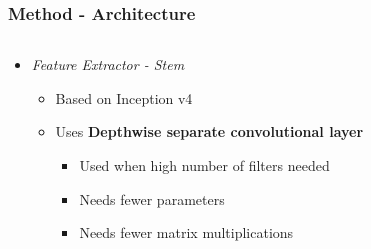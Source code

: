 \documentclass[9pt]{beamer}
\newenvironment{myframe}[1][]{%
\begin{frame}%
\frametitle{#1}
\setcounter{footnote}{0}


}{%
\end{frame}%
}
\begin{document}
\begin{myframe}[Method - Architecture]
    \begin{columns}[T]
        \begin{column}{.45\textwidth}
            \begin{itemize}
                \item \textit{Feature Extractor - Stem}
                \begin{itemize}
                    \item Based on Inception v4 \footnotemark
                    \item Uses \textbf{Depthwise separate convolutional layer}\footnotemark\footnotemark
                    \begin{itemize}
                        \item Used when high number of filters needed
                        \item Needs fewer parameters
                        \item Needs fewer matrix multiplications
                    \end{itemize}
                \end{itemize}
            \end{itemize}
        \end{column}
        \begin{column}{.45\textwidth}
            \begin{figure}

\end{figure}
\end{column}
\end{columns}
\end{myframe}
\end{document}
